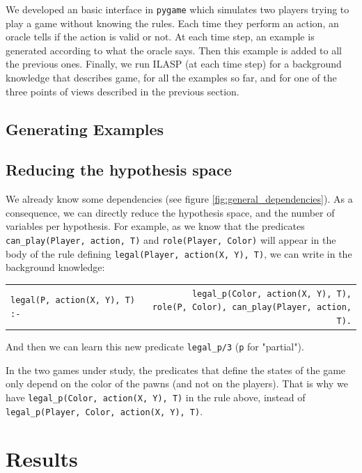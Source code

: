 We developed an basic interface in \texttt{pygame} which simulates two players  trying to play a game without knowing the rules. Each time they perform an action, an oracle tells if the action is valid or not. At each time step, an example is generated according to what the oracle says. Then this example is added to all the previous ones. Finally, we run ILASP (at each time step) for a background knowledge that describes game, for all the examples so far, and for one of the three points of views described in the previous section.

\subsection{Generating Examples}


\subsection{Reducing the hypothesis space}

We already know some dependencies (see figure \ref{fig:general_dependencies}). As a consequence, we can directly reduce the hypothesis space, and the number of variables per hypothesis. For example, as we know that the predicates \texttt{can\_play(Player, action, T)} and  \texttt{role(Player, Color)} will appear in the body of the rule defining \texttt{legal(Player, action(X, Y), T)}, we can write in the background knowledge:\newline
\begin{tabular}{lr}
\texttt{legal(P, action(X, Y), T) :-} & \makecell[tl]{\texttt{legal\_p(Color, action(X, Y), T),}\\ \texttt{role(P, Color), can\_play(Player, action, T).}}\\
\end{tabular}
And then we can learn this new predicate \texttt{legal\_p/3} (\texttt{p} for "partial"). 

\begin{remark}
In the two games under study, the predicates that define the states of the game only depend on the color of the pawns (and not on the players). That is why we have  \texttt{legal\_p(Color, action(X, Y), T)} in the rule above, instead of \texttt{legal\_p(Player, Color, action(X, Y), T)}.
\end{remark}

\section{Results}

